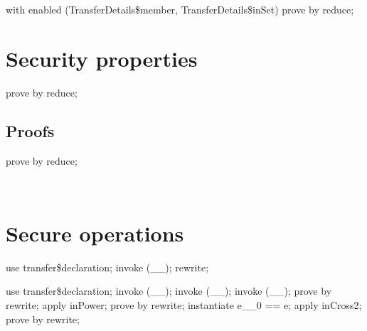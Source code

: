 \begin{LPScript}\begin{zproof}[fTransferDetailsInSetMember]
    with enabled (TransferDetails\$member, TransferDetails\$inSet) prove by reduce;
\end{zproof}\end{LPScript}


\section{Security properties}


\begin{LPScript}\begin{zproof}[fAuthenticNameType]
    prove by reduce;
\end{zproof}\end{LPScript}

\subsection*{Proofs}

\begin{LDCheck}\begin{zproof}
    prove by reduce;
\end{zproof}~\end{LDCheck}

\section{Secure operations}

\begin{LPScript}\begin{zproof}[gAINTrasferPFunMaxType]
    use transfer\$declaration;
    invoke (\_\fun \_);
    rewrite;
\end{zproof}\end{LPScript}

\begin{LPScript}\begin{zproof}[gAINTrasferRelType]
    use transfer\$declaration;
    invoke (\_\fun \_);
    invoke (\_\pfun \_);
    invoke (\_\rel \_);
    prove by rewrite;
    apply inPower;
    prove by rewrite;
    instantiate e\_\_0 == e;
    apply inCross2;
    prove by rewrite;
\end{zproof}\end{LPScript}

